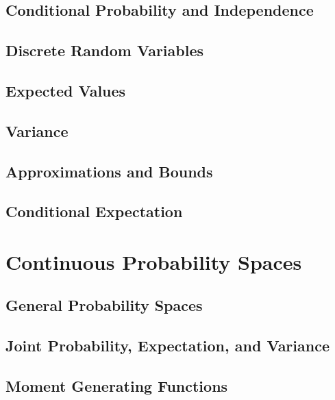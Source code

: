 \documentclass[10pt]{article}
\begin{document}
\newpage
\subsection{Conditional Probability and Independence}


\newpage
\subsection{Discrete Random Variables}


\newpage
\subsection{Expected Values}


\newpage
\subsection{Variance}


\newpage
\subsection{Approximations and Bounds}


\newpage
\subsection{Conditional Expectation}


\newpage
\section{Continuous Probability Spaces}
\subsection{General Probability Spaces}


\newpage
\subsection{Joint Probability, Expectation, and Variance}


\newpage
\subsection{Moment Generating Functions}

\end{document}
